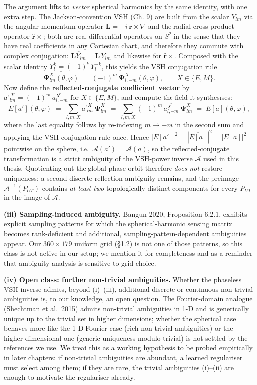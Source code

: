 \documentclass[
  english,
  11pt,
]{report}
\begin{document}
The argument lifts to \emph{vector} spherical harmonics by the same
identity, with one extra step. The Jackson-convention VSH (Ch. 9) are
built from the scalar \(Y_{lm}\) via the angular-momentum operator
\(\mathbf L = -i\,\mathbf r \times \nabla\) and the radial-cross-product
operator \(\hat{\mathbf r}\times\); both are real differential operators
on \(S^2\) in the sense that they have real coefficients in any
Cartesian chart, and therefore they commute with complex conjugation:
\(\overline{\mathbf L Y_{lm}} = \mathbf L\,\overline{Y_{lm}}\) and
likewise for \(\hat{\mathbf r}\times\). Composed with the scalar
identity \(Y_l^k = (-1)^k\,\overline{Y_l^{-k}}\), this yields the VSH
conjugation rule \[
\overline{\boldsymbol{\Psi}^X_{lm}(\theta,\varphi)} \;=\; (-1)^m\,\boldsymbol{\Psi}^X_{l,-m}(\theta,\varphi),
\qquad X\in\{E,M\}.
\] Now define the \textbf{reflected-conjugate coefficient vector} by
\(a'^{\,X}_{lm} = (-1)^m\,\overline{a^X_{l,-m}}\) for
\(X \in \{E, M\}\), and compute the field it synthesises: \[
E[a'](\theta,\varphi) \;=\; \sum_{l,m,X} a'^{\,X}_{lm}\,\boldsymbol\Psi^X_{lm}
\;=\; \sum_{l,m,X} (-1)^m\,\overline{a^X_{l,-m}}\,\boldsymbol\Psi^X_{lm}
\;=\; \overline{E[a]}(\theta,\varphi),
\] where the last equality follows by re-indexing \(m \to -m\) in the
second sum and applying the VSH conjugation rule once. Hence
\(|E[a']|^2 = |\overline{E[a]}|^2 = |E[a]|^2\) pointwise on the sphere,
i.e.~\(\mathcal A(a') = \mathcal A(a)\), so the reflected-conjugate
transformation is a strict ambiguity of the VSH-power inverse
\(\mathcal A\) used in this thesis. Quotienting out the global-phase
orbit therefore \emph{does not} restore uniqueness: a second discrete
reflection ambiguity remains, and the preimage
\(\mathcal{A}^{-1}(P_{UT})\) contains \emph{at least two} topologically
distinct components for every \(P_{UT}\) in the image of
\(\mathcal{A}\).

\textbf{(iii) Sampling-induced ambiguity.} Bangun 2020, Proposition
6.2.1, exhibits explicit sampling patterns for which the
spherical-harmonic sensing matrix becomes rank-deficient and additional,
sampling-pattern-dependent ambiguities appear. Our \(360\times 179\)
uniform grid (§1.2) is not one of those patterns, so this class is not
active in our setup; we mention it for completeness and as a reminder
that ambiguity analysis is sensitive to grid choice.

\textbf{(iv) Open class: further non-trivial ambiguities.} Whether the
phaseless VSH inverse admits, beyond (i)--(iii), additional discrete or
continuous non-trivial ambiguities is, to our knowledge, an open
question. The Fourier-domain analogue (Shechtman et al.~2015) admits
non-trivial ambiguities in 1-D and is generically unique up to the
trivial set in higher dimensions; whether the spherical case behaves
more like the 1-D Fourier case (rich non-trivial ambiguities) or the
higher-dimensional one (generic uniqueness modulo trivial) is not
settled by the references we use. We treat this as a working hypothesis
to be probed empirically in later chapters: if non-trivial ambiguities
are abundant, a learned regulariser must select among them; if they are
rare, the trivial ambiguities (i)--(ii) are enough to motivate the
regulariser already.
\end{document}
